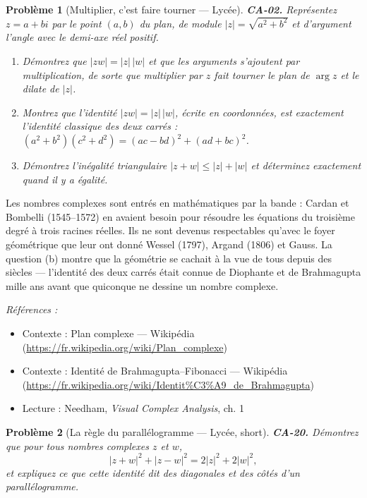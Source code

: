\documentclass[11pt]{article}
\newtheorem{problem}{Problème}
\newenvironment{refs}{\par\small\noindent\emph{Références :}\begin{itemize}\setlength\itemsep{0pt}}{\end{itemize}\normalsize}
\begin{document}
\begin{problem}[{Multiplier, c'est faire tourner --- Lycée}]
\textbf{CA-02.} Représentez $ z = a + bi $ par le point $ (a, b) $ du
plan, de module $ |z| = \sqrt{a^2 + b^2} $ et d'argument l'angle avec le demi-axe réel
positif.
\begin{enumerate}
\item[(a)] Démontrez que $ |zw| = |z|\,|w| $ et que les arguments s'ajoutent par multiplication,
de sorte que multiplier par $ z $ fait tourner le plan de $ \arg z $ et le dilate de $ |z| $.
\item[(b)] Montrez que l'identité $ |zw| = |z|\,|w| $, écrite en coordonnées, est exactement
l'identité classique des deux carrés :
$ (a^2 + b^2)(c^2 + d^2) = (ac - bd)^2 + (ad + bc)^2 $.
\item[(c)] Démontrez l'inégalité triangulaire $ |z + w| \le |z| + |w| $ et déterminez exactement quand
il y a égalité.
\end{enumerate}

\end{problem}

\noindent Les nombres complexes sont entrés en mathématiques par la bande : Cardan et
Bombelli (1545--1572) en avaient besoin pour résoudre les équations du troisième degré à trois
racines réelles. Ils ne sont devenus respectables qu'avec le foyer géométrique que leur ont donné
Wessel (1797), Argand (1806) et Gauss. La question (b) montre que la géométrie se cachait à la vue
de tous depuis des siècles --- l'identité des deux carrés était connue de Diophante et de Brahmagupta
mille ans avant que quiconque ne dessine un nombre complexe.

\begin{refs}
\item Contexte : Plan complexe --- Wikipédia (\url{https://fr.wikipedia.org/wiki/Plan_complexe})
\item Contexte : Identité de Brahmagupta--Fibonacci --- Wikipédia (\url{https://fr.wikipedia.org/wiki/Identit%C3%A9_de_Brahmagupta})
\item Lecture : Needham, \textit{Visual Complex Analysis}, ch. 1
\end{refs}

\bigskip

\begin{problem}[{La règle du parallélogramme --- Lycée, short}]
\textbf{CA-20.} Démontrez que pour tous nombres complexes $ z $ et $ w $,
\[ |z + w|^2 + |z - w|^2 = 2|z|^2 + 2|w|^2, \]
et expliquez ce que cette identité dit des diagonales et des côtés d'un parallélogramme.
\end{problem}
\end{document}
